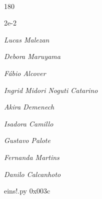 \documentclass[12pt]{article}
\begin{document}
	\hfill	  	  


\pagebreak			

	\ 
	\vfill
	\begin{turn}{180}	
		\begin{minipage}{\textwidth}
		  	\ttfamily %
			\centering
			{\Huge 2e-2}
		  
			\hfill
		  
			

\textit{\small Lucas Malezan}

\textit{\small Debora Maruyama}

\textit{\small Fábio Alcover}

\textit{\small Ingrid Midori Noguti Catarino}

\textit{\small Akira Demenech}

\textit{\small Isadora Camillo}

\textit{\small Gustavo Palote}

\textit{\small Fernanda Martins}

\textit{\small Danilo Calcanhoto}

\bigskip

eins!.py
0x003c


		\end{minipage}	
	\end{turn}
	\vfill
	\

\pagebreak
\end{document}
